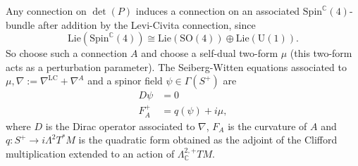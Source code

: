     Any connection on $\det(P)$ induces a connection on an associated $\mathrm{Spin}^\mathbb{C}(4)$-bundle after addition by the Levi-Civita connection, since \[\mathrm{Lie}(\mathrm{Spin}^\mathbb{C}(4))\cong \mathrm{Lie}(\mathrm{SO}(4))\oplus\mathrm{Lie}(\mathrm{U}(1)).\] So choose such a connection $A$ and choose a self-dual two-form $\mu$ (this two-form acts as a perturbation parameter). The Seiberg-Witten equations associated to $\mu,\nabla:=\nabla^\mathrm{LC}+\nabla^A$ and a spinor field $\psi\in\Gamma(S^+)$ are
    \begin{align}
        D\psi &= 0\\
        F_A^+ &= q(\psi) + i\mu,\label{unification:sw2}
    \end{align}
    where $D$ is the Dirac operator associated to $\nabla$, $F_A$ is the curvature of $A$ and $q:S^+\rightarrow i\Lambda^2T^*M$ is the quadratic form obtained as the adjoint of the Clifford multiplication extended to an action of $\Lambda^{2,+}_\mathbb{C}TM$.

